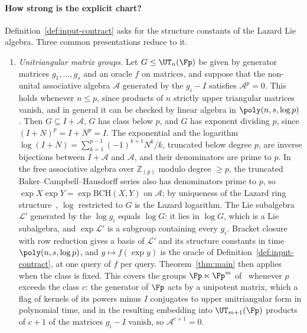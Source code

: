 \paragraph{How strong is the explicit chart?}
Definition~\ref{def:input-contract} asks for the structure constants of the Lazard Lie algebra. Three common presentations reduce to it.
\begin{enumerate}[label=(\alph*),leftmargin=2em]
  \item \emph{Unitriangular matrix groups.} Let $G \le \UT_n(\Fp)$ be given by generator matrices $g_1,\dots,g_s$ and an oracle $f$ on matrices, and suppose that the non-unital associative algebra $\mathcal{A}$ generated by the $g_i - I$ satisfies $\mathcal{A}^p = 0$. This holds whenever $n \le p$, since products of $n$ strictly upper triangular matrices vanish, and in general it can be checked by linear algebra in $\poly(n,s,\log p)$. Then $G \subseteq I + \mathcal{A}$, $G$ has class below $p$, and $G$ has exponent dividing $p$, since $(I+N)^p = I + N^p = I$. The exponential and the logarithm $\log(I+N) = \sum_{k=1}^{p-1}(-1)^{k+1}N^k/k$, truncated below degree $p$, are inverse bijections between $I+\mathcal{A}$ and $\mathcal{A}$, and their denominators are prime to $p$. In the free associative algebra over $\mathbb{Z}_{(p)}$ modulo degree $\ge p$, the truncated Baker--Campbell--Hausdorff series also has denominators prime to $p$, so $\exp X \exp Y = \exp \mathrm{BCH}(X,Y)$ on $\mathcal{A}$; by uniqueness of the Lazard ring structure~\cite[\S10.2 and Example~10.24, p.~124]{Khukhro1998}, $\log$ restricted to $G$ is the Lazard logarithm. The Lie subalgebra $\mathcal{L}'$ generated by the $\log g_i$ equals $\log G$: it lies in $\log G$, which is a Lie subalgebra, and $\exp\mathcal{L}'$ is a subgroup containing every $g_i$. Bracket closure with row reduction gives a basis of $\mathcal{L}'$ and its structure constants in time $\poly(n,s,\log p)$, and $y \mapsto f(\exp y)$ is the oracle of Definition~\ref{def:input-contract}, at one query of $f$ per query. Theorem~\ref{thm:main} then applies when the class is fixed. This covers the groups $\Fp \ltimes \Fp^m$ of~\cite{BaconChildsVanDam2005,IvanyosSantha2015} whenever $p$ exceeds the class $c$: the generator of $\Fp$ acts by a unipotent matrix, which a flag of kernels of its powers minus $I$ conjugates to upper unitriangular form in polynomial time, and in the resulting embedding into $\UT_{m+1}(\Fp)$ products of $c+1$ of the matrices $g_i - I$ vanish, so $\mathcal{A}^{c+1} = 0$.

\end{enumerate}
